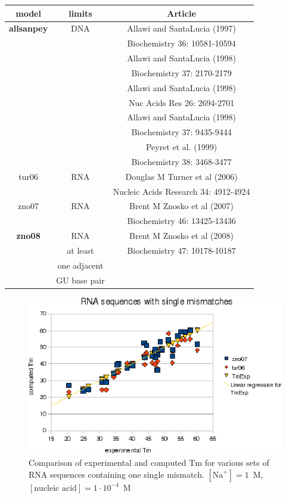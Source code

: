 \documentclass{article}
\begin{document}
\begin{table}[hc]
\begin{tabular}[h]{| c | c | c |}
\textbf{model} & \textbf{limits} & \textbf{Article} \\
 \hline
\textbf{allsanpey} & DNA & Allawi and SantaLucia (1997)\\
 & & Biochemistry 36: 10581-10594 \\
 & & Allawi and SantaLucia (1998)\\
 & & Biochemistry 37: 2170-2179 \\
 & & Allawi and SantaLucia (1998)\\
 & & Nuc Acids Res 26: 2694-2701 \\
 & & Allawi and SantaLucia (1998)\\
 & & Biochemistry 37: 9435-9444 \\
 & & Peyret et al. (1999)\\
 & & Biochemistry 38: 3468-3477 \\
 \hline 
tur06 & RNA & Douglas M Turner et al (2006)\\
 & & Nucleic Acids Research 34: 4912-4924 \\
 \hline
zno07 & RNA & Brent M Znosko et al (2007)\\
 & & Biochemistry 46: 13425-13436 \\
 \hline
\textbf{zno08} & RNA & Brent M Znosko et al (2008)\\
 & at least & Biochemistry 47: 10178-10187 \\
 & one adjacent & \\
 & GU base pair & \\
 \hline
\end{tabular}
\end{table}
\pagebreak

\begin{figure}[h]
\includegraphics[width=1\linewidth]{images/RNASingleMismatch}
\caption{Comparison of experimental and computed Tm for various sets of
 RNA sequences containing one single mismatch. $[\mbox{Na}^+] = 1$~M, $[\mbox{nucleic acid}] = 1\cdot{}10^{-4}$~M}
\end{figure}
\end{document}
